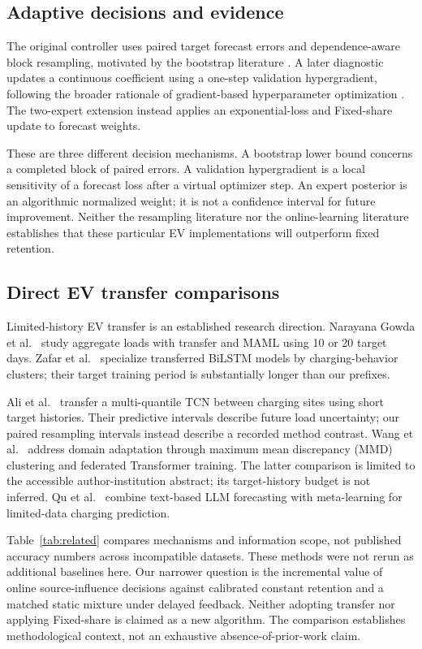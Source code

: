 \documentclass[pdflatex,iicol,sn-mathphys-num]{sn-jnl}
\begin{document}
\subsection{Adaptive decisions and evidence}
The original controller uses paired target forecast errors and dependence-aware block resampling, motivated by the bootstrap literature \cite{kunsch1989}. A later diagnostic updates a continuous coefficient using a one-step validation hypergradient, following the broader rationale of gradient-based hyperparameter optimization \cite{luketina2016}. The two-expert extension instead applies an exponential-loss and Fixed-share update \cite{herbster1998} to forecast weights.

These are three different decision mechanisms. A bootstrap lower bound concerns a completed block of paired errors. A validation hypergradient is a local sensitivity of a forecast loss after a virtual optimizer step. An expert posterior is an algorithmic normalized weight; it is not a confidence interval for future improvement. Neither the resampling literature nor the online-learning literature establishes that these particular EV implementations will outperform fixed retention.

\subsection{Direct EV transfer comparisons}

Limited-history EV transfer is an established research direction. Narayana Gowda et al.\ \cite{gowda2026} study aggregate loads with transfer and MAML using 10 or 20 target days. Zafar et al.\ \cite{zafar2025} specialize transferred BiLSTM models by charging-behavior clusters; their target training period is substantially longer than our prefixes.

Ali et al.\ \cite{ali2024} transfer a multi-quantile TCN between charging sites using short target histories. Their predictive intervals describe future load uncertainty; our paired resampling intervals instead describe a recorded method contrast. Wang et al.\ \cite{wang2025federated} address domain adaptation through maximum mean discrepancy (MMD) clustering and federated Transformer training. The latter comparison is limited to the accessible author-institution abstract; its target-history budget is not inferred. Qu et al.\ \cite{qu2024chatev} combine text-based LLM forecasting with meta-learning for limited-data charging prediction.

Table~\ref{tab:related} compares mechanisms and information scope, not published accuracy numbers across incompatible datasets. These methods were not rerun as additional baselines here. Our narrower question is the incremental value of online source-influence decisions against calibrated constant retention and a matched static mixture under delayed feedback. Neither adopting transfer nor applying Fixed-share is claimed as a new algorithm. The comparison establishes methodological context, not an exhaustive absence-of-prior-work claim.
\end{document}
